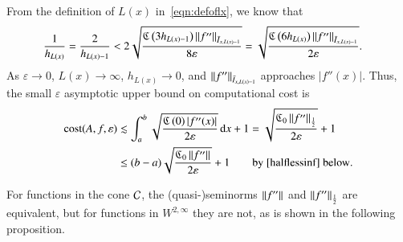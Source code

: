 \documentclass[review]{elsarticle}
\newcommand{\abstol}{\varepsilon}
\theoremstyle{definition}
\renewcommand{\cw}{W}
\begin{document}
From the definition of $L(x)$ in~\eqref{eqn:defoflx}, we know that
\begin{align*}
\frac{1}{h_{L(x)}} = \frac{2}{h_{L(x)-1}}
& < 2 \sqrt{\frac{\fC\left(3 h_{L(x)-1} \right)\norm[\bar{I}_{x,L(x)-1}]{f''} }{8\abstol}}
= \sqrt{\frac{\fC\left(6 h_{L(x)} \right)\norm[\bar{I}_{x,L(x)-1}]{f''} }{2\abstol}}.
\end{align*}
As $\abstol \to 0$, $L(x) \to \infty$, $h_{L(x)} \to 0$, and  $\norm[\bar{I}_{x,L(x)-1}]{f''}$
approaches $|f''(x)|$.  Thus, the small $\abstol$ asymptotic upper bound on
computational cost is
\begin{align*}
\cost(A,f,\abstol)
&\lesssim \int_a^b \sqrt{\frac{\fC\left(0\right)   |f''(x)|}{2\abstol}} \, \dif x +1
=\sqrt{\frac{\fC_0 \norm[\frac 12]{f''}}{2\abstol}} +1  \\
& \le (b-a)\sqrt{\frac{\fC_0 \norm{f''}}{2\abstol}} +1  \qquad
\text{by \eqref{halflessinf} below}.
\end{align*}

For functions in the cone $\cc$, the (quasi-)seminorms $\norm{f''}$ and $\norm[\frac
12]{f''}$ are equivalent, but  for functions in $ \cw^{2,\infty}$ they are not, as is shown in the following proposition.
\end{document}

